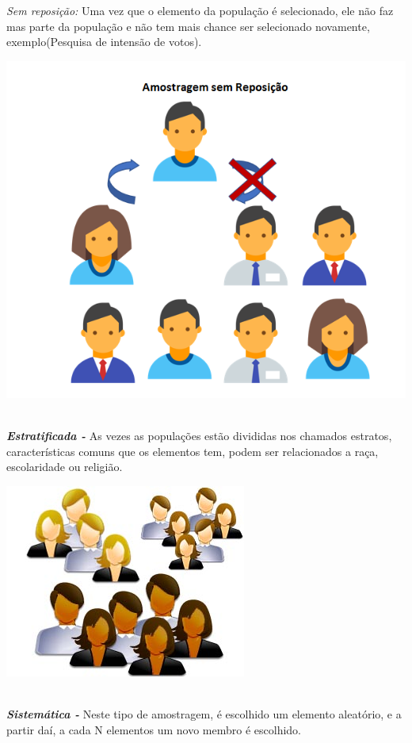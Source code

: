 \newpage

\textit{Sem reposição:}
Uma vez que o elemento da população é selecionado, ele não faz mas parte da população e não tem mais chance ser selecionado novamente, exemplo(Pesquisa de intensão de votos). 

{\centering \includegraphics[scale=0.45]{cap1/Amostragem/amostragemSemReposicao.png} \par}

\textbf{\textit{\\Estratificada -}}
As vezes as populações estão divididas nos chamados estratos, características comuns que os elementos tem, podem ser relacionados a raça, escolaridade ou religião.

{\centering \includegraphics[scale=0.45]{cap1/Amostragem/amostragemEstratificada.jpg} \par}

\textbf{\textit{\\Sistemática -}}
Neste tipo de amostragem, é escolhido um elemento aleatório, e a partir daí, a cada N elementos um novo membro é escolhido.

